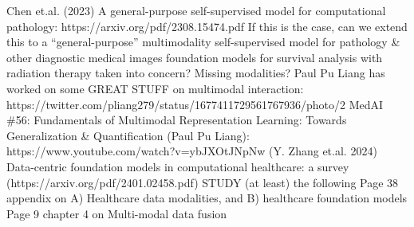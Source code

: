 \documentclass{article}%
\begin{document}
%
Chen et.al. (2023) A general{-}purpose self{-}supervised model for computational pathology: https://arxiv.org/pdf/2308.15474.pdf %
\newline%
\newline%
%
If this is the case, can we extend this to a “general{-}purpose” multimodality self{-}supervised model for pathology \& other diagnostic medical images foundation models for survival analysis with radiation therapy taken into concern? %
\newline%
\newline%
%
Missing modalities? %
\newline%
\newline%
%
Paul Pu Liang has worked on some GREAT STUFF on multimodal interaction: https://twitter.com/pliang279/status/1677411729561767936/photo/2 %
\newline%
\newline%
%
MedAI \#56: Fundamentals of Multimodal Representation Learning: Towards Generalization \& Quantification (Paul Pu Liang): https://www.youtube.com/watch?v=ybJXOtJNpNw %
\newline%
\newline%
%
(Y. Zhang et.al. 2024) Data{-}centric foundation models in computational healthcare: a survey (https://arxiv.org/pdf/2401.02458.pdf)%
\newline%
\newline%
%
STUDY (at least) the following%
\newline%
\newline%
%
Page 38 appendix on A) Healthcare data modalities, and B) healthcare foundation models %
\newline%
\newline%
%
Page 9 chapter 4 on Multi{-}modal data fusion %
\newline%
\newline%
%
\end{document}
